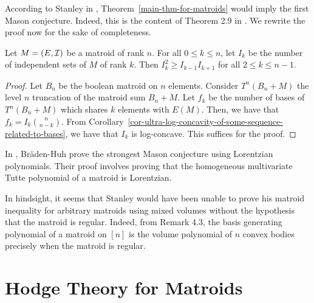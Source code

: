 \documentclass{puthesis-UG}
\begin{document}
According to Stanley in \cite{STANLEY}, Theorem~\ref{main-thm-for-matroids} would imply the first Mason conjecture. Indeed, this is the content of Theorem 2.9 in \cite{STANLEY}. We rewrite the proof now for the sake of completeness. 

\begin{thm}
	Let $M = (E, \mathcal{I})$ be a matroid of rank $n$. For all $0 \leq k \leq n$, let $I_k$ be the number of independent sets of $M$ of rank $k$. Then $I_k^2 \geq I_{k-1} I_{k+1}$ for all $2 \leq k \leq n-1$. 
\end{thm}

\begin{proof}
	Let $B_n$ be the boolean matroid on $n$ elements. Consider $T^n (B_n + M)$ the level $n$ truncation of the matroid sum $B_n + M$. Let $f_k$ be the number of bases of $T^n(B_n + M)$ which shares $k$ elements with $E(M)$. Then, we have that $f_k = I_k \binom{n}{n-k}$. From Corollary~\ref{cor-ultra-log-concavity-of-some-sequence-related-to-bases}, we have that $I_k$ is log-concave. This suffices for the proof. 
\end{proof}

\begin{remark}
	In \cite{lorentzian-polynomials}, Br\"aden-Huh prove the strongest Mason conjecture using Lorentzian polynomials. Their proof involves proving that the homogeneous multivariate Tutte polynomial of a matroid is Lorentzian. 
\end{remark}

\begin{remark}
	In hindsight, it seems that Stanley would have been unable to prove his matroid inequality for arbitrary matroids using mixed volumes without the hypothesis that the matroid is regular. Indeed, from Remark 4.3, the basis generating polynomial of a matroid on $[n]$ is the volume polynomial of $n$ convex bodies precisely when the matroid is regular.
\end{remark}

\chapter{Hodge Theory for Matroids} \label{chap:hodge-theory-for-matroids}
\end{document}
